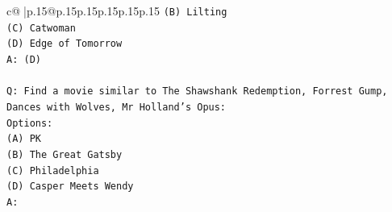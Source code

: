 \documentclass{article}
\begin{document}
{\begin{supertabular}{c@{$\;$}|p{.15\linewidth}@{}p{.15\linewidth}p{.15\linewidth}p{.15\linewidth}p{.15\linewidth}p{.15\linewidth}}
{{{\texttt{(B) Lilting} \\
\texttt{(C) Catwoman} \\
\texttt{(D) Edge of Tomorrow} \\
\texttt{A: (D)} \\
\\ 
\texttt{Q: Find a movie similar to The Shawshank Redemption, Forrest Gump, Dances with Wolves, Mr Holland's Opus:} \\
\texttt{Options:} \\
\texttt{(A) PK} \\
\texttt{(B) The Great Gatsby} \\
\texttt{(C) Philadelphia} \\
\texttt{(D) Casper Meets Wendy} \\
\texttt{A:} \\
            }
        }
    }
     \\ \\


\end{supertabular}}
\end{document}
